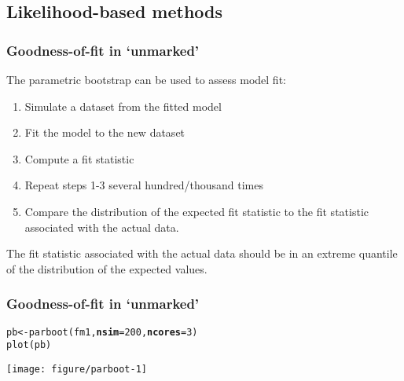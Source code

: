 \documentclass[color=usenames,dvipsnames]{beamer}\usepackage[]{graphicx}\usepackage[]{color}
\makeatletter
\def\maxwidth{ %
  \ifdim\Gin@nat@width>\linewidth
    \linewidth
  \else
    \Gin@nat@width
  \fi
}
\newcommand{\hlnum}[1]{\textcolor[rgb]{0.69,0.494,0}{#1}}%
\newcommand{\hlstd}[1]{\textcolor[rgb]{0,0,0}{#1}}%
\newcommand{\hlkwb}[1]{\textcolor[rgb]{0,0.341,0.682}{#1}}%
\newcommand{\hlkwc}[1]{\textcolor[rgb]{0,0,0}{\textbf{#1}}}%
\newcommand{\hlkwd}[1]{\textcolor[rgb]{0.004,0.004,0.506}{#1}}%
\newenvironment{kframe}{%
 \def\at@end@of@kframe{}%
 \ifinner\ifhmode%
  \def\at@end@of@kframe{\end{minipage}}%
  \begin{minipage}{\columnwidth}%
 \fi\fi%
 \def\FrameCommand##1{\hskip\@totalleftmargin \hskip-\fboxsep
 \colorbox{shadecolor}{##1}\hskip-\fboxsep
     \hskip-\linewidth \hskip-\@totalleftmargin \hskip\columnwidth}%
 \MakeFramed {\advance\hsize-\width
   \@totalleftmargin\z@ \linewidth\hsize
   \@setminipage}}%
 {\par\unskip\endMakeFramed%
 \at@end@of@kframe}
\newenvironment{knitrout}{}{} %
\makeatother
\begin{document}
\subsection{Likelihood-based methods}



\begin{frame}[fragile]
  \frametitle{Goodness-of-fit in `unmarked'}
  The parametric bootstrap can be used to assess model fit:
  \begin{enumerate}
    \item Simulate a dataset from the fitted model
    \item Fit the model to the new dataset
    \item Compute a fit statistic
    \item Repeat steps 1-3 several hundred/thousand times
    \item Compare the distribution of the \alert{expected} fit
      statistic to the fit statistic associated with
      the actual data. 
  \end{enumerate}
  The fit statistic associated with the actual data should be in an
  extreme quantile of the distribution of the expected values.
\end{frame}




\begin{frame}[fragile]
  \frametitle{Goodness-of-fit in `unmarked'}
\begin{knitrout}\small
{}\color{fgcolor}\begin{kframe}
\begin{alltt}
\hlstd{pb} \hlkwb{<-} \hlkwd{parboot}\hlstd{(fm1,} \hlkwc{nsim}\hlstd{=}\hlnum{200}\hlstd{,} \hlkwc{ncores}\hlstd{=}\hlnum{3}\hlstd{)}
\hlkwd{plot}\hlstd{(pb)}
\end{alltt}
\end{kframe}
\texttt{[image: figure/parboot-1]} 

\end{knitrout}
\end{frame}




\end{document}
